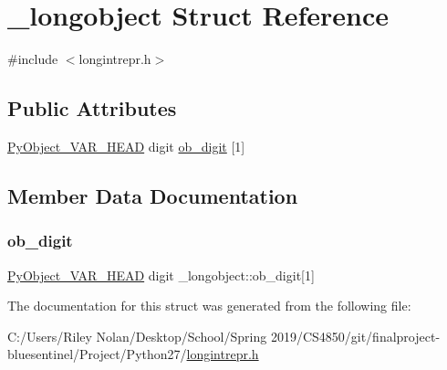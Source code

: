 \hypertarget{struct__longobject}{}\section{\+\_\+longobject Struct Reference}
\label{struct__longobject}


{\ttfamily \#include $<$longintrepr.\+h$>$}

\subsection*{Public Attributes}
\begin{DoxyCompactItemize}
\item 
\mbox{\hyperlink{_python27_2object_8h_aa0eba161a76be8710b3de325c2e7f9e2}{Py\+Object\+\_\+\+V\+A\+R\+\_\+\+H\+E\+AD}} digit \mbox{\hyperlink{struct__longobject_a51d41b184bbe2c21854826c1f5ef4a99}{ob\+\_\+digit}} \mbox{[}1\mbox{]}
\end{DoxyCompactItemize}


\subsection{Member Data Documentation}
\mbox{\label{struct__longobject_a51d41b184bbe2c21854826c1f5ef4a99}} 
\subsubsection{\texorpdfstring{ob\_digit}{ob\_digit}}
{\footnotesize\ttfamily \mbox{\hyperlink{_python27_2object_8h_aa0eba161a76be8710b3de325c2e7f9e2}{Py\+Object\+\_\+\+V\+A\+R\+\_\+\+H\+E\+AD}} digit \+\_\+longobject\+::ob\+\_\+digit\mbox{[}1\mbox{]}}



The documentation for this struct was generated from the following file\+:\begin{DoxyCompactItemize}
\item 
C\+:/\+Users/\+Riley Nolan/\+Desktop/\+School/\+Spring 2019/\+C\+S4850/git/finalproject-\/bluesentinel/\+Project/\+Python27/\mbox{\hyperlink{longintrepr_8h}{longintrepr.\+h}}\end{DoxyCompactItemize}

